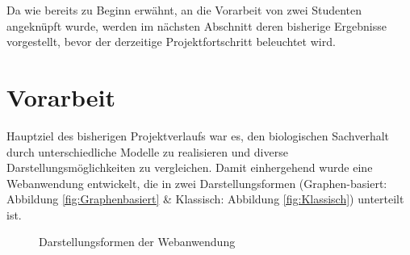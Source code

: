 \documentclass[11pt,a4paper,pointlessnumbers]{scrreprt}  %
\begin{document}
Da wie bereits zu Beginn erwähnt, an die Vorarbeit von zwei Studenten angeknüpft wurde, werden im nächsten Abschnitt deren bisherige Ergebnisse vorgestellt, bevor der derzeitige Projektfortschritt beleuchtet wird.


\chapter{Vorarbeit}
Hauptziel des bisherigen Projektverlaufs war es, den biologischen Sachverhalt durch unterschiedliche Modelle zu realisieren und diverse Darstellungsmöglichkeiten zu vergleichen. Damit einhergehend wurde eine Webanwendung entwickelt, die in zwei Darstellungsformen (Graphen-basiert: Abbildung \ref{fig:Graphenbasiert} \& Klassisch: Abbildung \ref{fig:Klassisch}) unterteilt ist. 

\begin{figure}[!ht]
	\centering
	\caption{Darstellungsformen der Webanwendung \cite{Zellsimulator}} 
\end{figure} 
\end{document}
